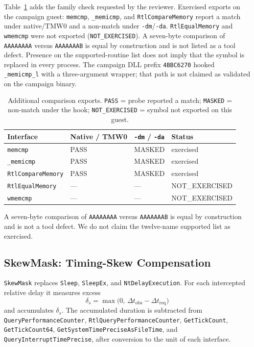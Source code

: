 \documentclass[pdflatex,sn-mathphys-num]{sn-jnl}
\theoremstyle{thmstyleone}
\theoremstyle{thmstyletwo}
\theoremstyle{thmstylethree}
\begin{document}
Table~\ref{tab:memcmp_family} adds the family check requested by the reviewer. Exercised exports on the campaign guest: \texttt{memcmp}, \texttt{\_memicmp}, and \texttt{RtlCompareMemory} report a match under native/TMW0 and a non-match under \texttt{-dm}/\texttt{-da}. \texttt{RtlEqualMemory} and \texttt{wmemcmp} were not exported (\texttt{NOT\_EXERCISED}). A seven-byte comparison of \texttt{AAAAAAAA} versus \texttt{AAAAAAAB} is equal by construction and is not listed as a tool defect. Presence on the supported-routine list does not imply that the symbol is replaced in every process. The campaign DLL prefix \texttt{4BBC6270} hooked \texttt{\_memicmp\_l} with a three-argument wrapper; that path is not claimed as validated on the campaign binary.

\begin{table}[t]
\caption{Additional comparison exports. \texttt{PASS} = probe reported a match; \texttt{MASKED} = non-match under the hook; \texttt{NOT\_EXERCISED} = symbol not exported on this guest.}
\label{tab:memcmp_family}
\centering
\small
\begin{tabular}{llll}
\toprule
\textbf{Interface} & \textbf{Native / TMW0} & \texttt{-dm} / \texttt{-da} & \textbf{Status} \\
\midrule
\texttt{memcmp} & PASS & MASKED & exercised \\
\texttt{\_memicmp} & PASS & MASKED & exercised \\
\texttt{RtlCompareMemory} & PASS & MASKED & exercised \\
\texttt{RtlEqualMemory} & --- & --- & NOT\_EXERCISED \\
\texttt{wmemcmp} & --- & --- & NOT\_EXERCISED \\
\bottomrule
\end{tabular}
\vspace{3pt}
\parbox{\columnwidth}{\footnotesize A seven-byte comparison of \texttt{AAAAAAAA} versus \texttt{AAAAAAAB} is equal by construction and is not a tool defect. We do not claim the twelve-name supported list as exercised.}
\end{table}

\subsection{SkewMask: Timing-Skew Compensation}
\label{subsec:timing_skew_compensation}

\texttt{SkewMask} replaces \texttt{Sleep}, \texttt{SleepEx}, and \texttt{NtDelayExecution}. For each intercepted relative delay it measures excess
\begin{equation}
\delta_s = \max\bigl(0,\, \Delta t_{\mathrm{obs}} - \Delta t_{\mathrm{req}}\bigr)
\label{eq:skew_sleep}
\end{equation}
and accumulates $\delta_s$. The accumulated duration is subtracted from \texttt{QueryPerformanceCounter}, \texttt{RtlQueryPerformanceCounter}, \texttt{GetTickCount}, \texttt{GetTickCount64}, \texttt{GetSystemTimePreciseAsFileTime}, and \texttt{QueryInterruptTimePrecise}, after conversion to the unit of each interface.
\end{document}
